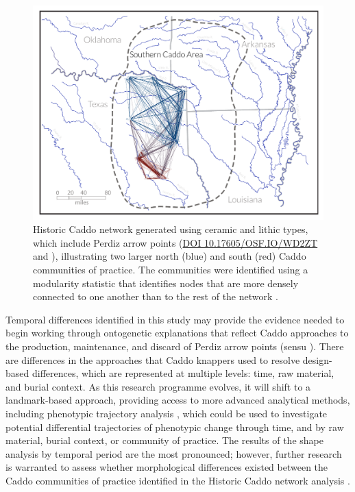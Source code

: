 \documentclass[review]{elsarticle}
\begin{document}
\begin{figure}[h!]\centering
\includegraphics[width=\linewidth]{fig.net.pdf}
\caption{Historic Caddo network generated using ceramic and lithic types, which include Perdiz arrow points (\href{https://osf.io/wd2zt/}{DOI 10.17605/OSF.IO/WD2ZT} and \citealt{RN8031}), illustrating two larger north (blue) and south (red) Caddo communities of practice. The communities were identified using a modularity statistic that identifies nodes that are more densely connected to one another than to the rest of the network \citep{RN8051,RN8024}.}
\label{fig:fig.net}
\end{figure}

Temporal differences identified in this study may provide the evidence needed to begin working through ontogenetic explanations that reflect Caddo approaches to the production, maintenance, and discard of Perdiz arrow points (sensu \citealt{RN5871}). There are differences in the approaches that Caddo knappers used to resolve design-based differences, which are represented at multiple levels: time, raw material, and burial context. As this research programme evolves, it will shift to a landmark-based approach, providing access to more advanced analytical methods, including phenotypic trajectory analysis \citep{RN8352,RN8561,RN8544,RN8560}, which could be used to investigate potential differential trajectories of phenotypic change through time, and by raw material, burial context, or community of practice. The results of the shape analysis by temporal period are the most pronounced; however, further research is warranted to assess whether morphological differences existed between the Caddo communities of practice identified in the Historic Caddo network analysis \citep{RN8031}.
\end{document}
